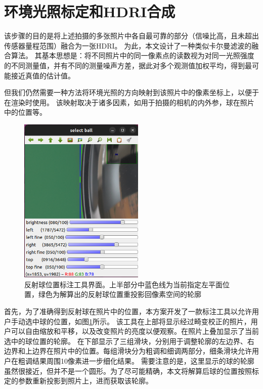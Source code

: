\documentclass{ctexart}
\begin{document}
\section{环境光照标定和HDRI合成}

该步骤的目的是将上述拍摄的多张照片中各自最可靠的部分（信噪比高，且未超出传感器量程范围）融合为一张HDRI。
为此，本文设计了一种类似卡尔曼滤波的融合算法。
其基本思想是：将不同照片中的同一像素点的读数视为对同一光照强度的不同测量值，并有不同的测量噪声方差，据此对多个观测值加权平均，得到最可能接近真值的估计值。

但我们仍然需要一种方法将环境光照的方向映射到该照片中的像素坐标上，以便于在渲染时使用。
该映射取决于诸多因素，如用于拍摄的相机的内外参，球在照片中的位置等。
\begin{figure}
    \centering
    \includegraphics[height=8cm]{figures/sphere_locator}
    \caption[反射球位置标注工具界面]{反射球位置标注工具界面。上半部分中蓝色线为当前指定左平面位置，绿色为解算出的反射球位置重投影回像素空间的轮廓}
    \label{fig:sphere_locator}
\end{figure}
首先，为了准确得到反射球在照片中的位置，本方案开发了一款标注工具以允许用户手动选中球的位置，如图\ref{fig:sphere_locator}所示。
该工具在上部将显示经过畸变校正的照片，用户可以自由缩放和平移，以及改变照片的亮度以便观察。在照片上叠加显示了当前选中的球位置的轮廓。
在下部显示了三组滑块，分别用于调整轮廓的左边界、右边界和上边界在照片中的位置。每组滑块分为粗调和细调两部分，细条滑块允许用户在粗调结果周围10像素进一步细化结果。
需要注意的是，这里显示的球的轮廓虽然很接近，但并不是一个圆形。为了尽可能精确，本文将解算后球的位置按照标定的参数重新投影到照片上，进而获取该轮廓。
\end{document}
